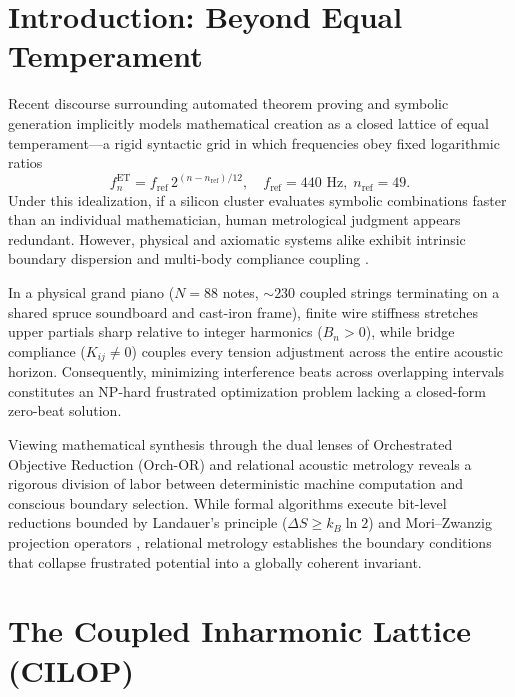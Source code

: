\documentclass[aps,prl,twocolumn,superscriptaddress,10pt]{revtex4-2}
\begin{document}
\section{Introduction: Beyond Equal Temperament}

Recent discourse surrounding automated theorem proving and symbolic generation implicitly models mathematical creation as a closed lattice of equal temperament---a rigid syntactic grid in which frequencies obey fixed logarithmic ratios
\begin{equation}
f_n^{\text{ET}} = f_{\text{ref}} \, 2^{(n - n_{\text{ref}})/12}, \quad f_{\text{ref}} = 440\text{ Hz}, \; n_{\text{ref}} = 49.
\label{eq:et_grid}
\end{equation}
Under this idealization, if a silicon cluster evaluates symbolic combinations faster than an individual mathematician, human metrological judgment appears redundant. However, physical and axiomatic systems alike exhibit intrinsic boundary dispersion and multi-body compliance coupling \cite{Railsback1938,Fletcher1964,Young1952,Conklin1996}.

In a physical grand piano ($N=88$ notes, $\sim 230$ coupled strings terminating on a shared spruce soundboard and cast-iron frame), finite wire stiffness stretches upper partials sharp relative to integer harmonics ($B_n > 0$), while bridge compliance ($K_{ij} \neq 0$) couples every tension adjustment across the entire acoustic horizon. Consequently, minimizing interference beats across overlapping intervals constitutes an NP-hard frustrated optimization problem lacking a closed-form zero-beat solution.

Viewing mathematical synthesis through the dual lenses of Orchestrated Objective Reduction (Orch-OR) \cite{HameroffPenrose2014} and relational acoustic metrology reveals a rigorous division of labor between deterministic machine computation and conscious boundary selection. While formal algorithms execute bit-level reductions bounded by Landauer's principle ($\Delta S \ge k_B \ln 2$) \cite{Landauer1961} and Mori--Zwanzig projection operators \cite{Mori1965,Zwanzig1961}, relational metrology establishes the boundary conditions that collapse frustrated potential into a globally coherent invariant.



\section{The Coupled Inharmonic Lattice (CILOP)}
\end{document}
